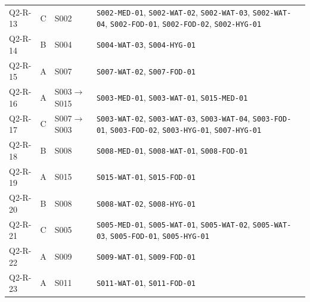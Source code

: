 \begin{longtable}{@{}lc>{\raggedright\arraybackslash}p{2.8cm}>{\raggedright\arraybackslash}p{8.8cm}@{}}
Q2-R-13 & C & S002 & \texttt{S002-MED-01}\allowbreak, \texttt{S002-WAT-02}\allowbreak, \texttt{S002-WAT-03}\allowbreak, \texttt{S002-WAT-04}\allowbreak, \texttt{S002-FOD-01}\allowbreak, \texttt{S002-FOD-02}\allowbreak, \texttt{S002-HYG-01}\allowbreak\\
Q2-R-14 & B & S004 & \texttt{S004-WAT-03}\allowbreak, \texttt{S004-HYG-01}\allowbreak\\
Q2-R-15 & A & S007 & \texttt{S007-WAT-02}\allowbreak, \texttt{S007-FOD-01}\allowbreak\\
Q2-R-16 & A & S003$\to$S015 & \texttt{S003-MED-01}\allowbreak, \texttt{S003-WAT-01}\allowbreak, \texttt{S015-MED-01}\allowbreak\\
Q2-R-17 & C & S007$\to$S003 & \texttt{S003-WAT-02}\allowbreak, \texttt{S003-WAT-03}\allowbreak, \texttt{S003-WAT-04}\allowbreak, \texttt{S003-FOD-01}\allowbreak, \texttt{S003-FOD-02}\allowbreak, \texttt{S003-HYG-01}\allowbreak, \texttt{S007-HYG-01}\allowbreak\\
Q2-R-18 & B & S008 & \texttt{S008-MED-01}\allowbreak, \texttt{S008-WAT-01}\allowbreak, \texttt{S008-FOD-01}\allowbreak\\
Q2-R-19 & A & S015 & \texttt{S015-WAT-01}\allowbreak, \texttt{S015-FOD-01}\allowbreak\\
Q2-R-20 & B & S008 & \texttt{S008-WAT-02}\allowbreak, \texttt{S008-HYG-01}\allowbreak\\
Q2-R-21 & C & S005 & \texttt{S005-MED-01}\allowbreak, \texttt{S005-WAT-01}\allowbreak, \texttt{S005-WAT-02}\allowbreak, \texttt{S005-WAT-03}\allowbreak, \texttt{S005-FOD-01}\allowbreak, \texttt{S005-HYG-01}\allowbreak\\
Q2-R-22 & A & S009 & \texttt{S009-WAT-01}\allowbreak, \texttt{S009-FOD-01}\allowbreak\\
Q2-R-23 & A & S011 & \texttt{S011-WAT-01}\allowbreak, \texttt{S011-FOD-01}\allowbreak\\
\bottomrule
\end{longtable}

